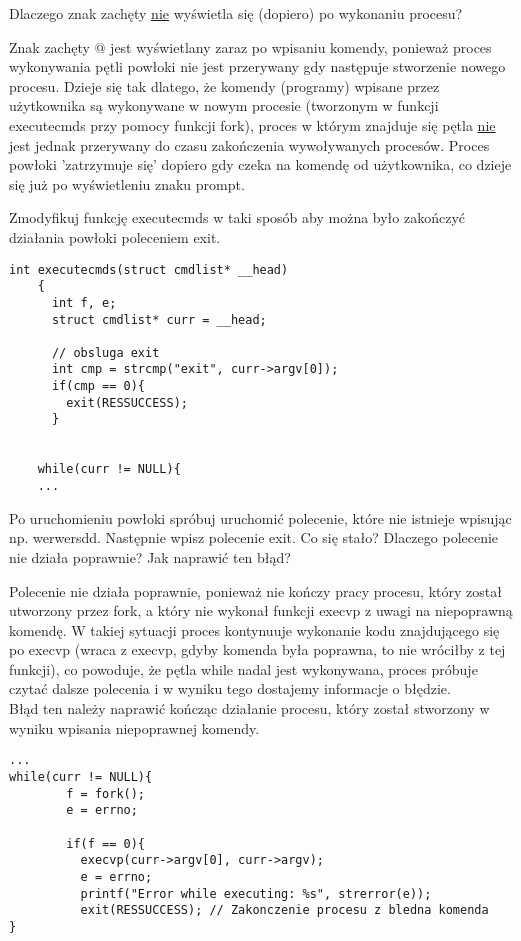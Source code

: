 \documentclass[a4paper,15pt]{article}
\newcommand{\ask}[2]{
    \begin{tcolorbox}[colback=black!5!white,colframe=gray,title={Pytanie #1}]
        #2
    \end{tcolorbox}
}
\newcommand{\assignment}[2]{
    \begin{tcolorbox}[colback=black!5!white,colframe=black,title={Zadanie #1}]
        #2
    \end{tcolorbox}
}
\begin{document}
\newpage
\ask{}
{Dlaczego znak zachęty \underline{nie} wyświetla się (dopiero) po wykonaniu procesu?}
Znak zachęty @ jest wyświetlany zaraz po wpisaniu komendy, ponieważ proces wykonywania pętli powłoki nie jest przerywany gdy następuje stworzenie nowego procesu. Dzieje się tak dlatego, że komendy (programy) wpisane przez użytkownika są wykonywane w nowym procesie (tworzonym w funkcji executecmds przy pomocy funkcji fork), proces w którym znajduje się pętla \underline{nie} jest jednak przerywany do czasu zakończenia 
wywoływanych procesów. Proces powłoki 'zatrzymuje się' dopiero gdy czeka na komendę od użytkownika, co dzieje się już po wyświetleniu znaku prompt. 


\assignment{}{Zmodyfikuj funkcję executecmds w taki sposób aby można było zakończyć działania powłoki poleceniem exit.}
\begin{lstlisting}[style=CStyle, label=some-code, caption=dodanie obsługi exit]
int executecmds(struct cmdlist* __head)
    {
      int f, e;
      struct cmdlist* curr = __head;
     
	  // obsluga exit
	  int cmp = strcmp("exit", curr->argv[0]);
	  if(cmp == 0){
	  	exit(RESSUCCESS);
	  }
	  
			
	while(curr != NULL){
	...
\end{lstlisting}

\assignment{}{Po uruchomieniu powłoki spróbuj uruchomić polecenie, które nie istnieje wpisując np. werwersdd. Następnie wpisz polecenie exit. Co się stało? Dlaczego polecenie nie działa poprawnie? Jak naprawić ten błąd?}
Polecenie nie działa poprawnie, ponieważ nie kończy pracy procesu, który został utworzony przez fork, a który nie wykonał funkcji execvp z uwagi na niepoprawną komendę. W takiej sytuacji proces kontynuuje wykonanie kodu znajdującego się po execvp (wraca z execvp, gdyby komenda była poprawna, to nie wróciłby z tej funkcji), co powoduje, że pętla while nadal jest wykonywana, proces próbuje czytać dalsze polecenia i w wyniku tego dostajemy informacje o błędzie. \\
Błąd ten należy naprawić kończąc działanie procesu, który został stworzony w wyniku wpisania niepoprawnej komendy. 
\begin{lstlisting}[style=CStyle, label=some-code, caption=zakończenie procesu po wywołaniu niepoprawnej komendy]
...
while(curr != NULL){
        f = fork();
        e = errno;
     
        if(f == 0){
          execvp(curr->argv[0], curr->argv);
          e = errno;
          printf("Error while executing: %s", strerror(e));
		  exit(RESSUCCESS); // Zakonczenie procesu z bledna komenda
}
\end{lstlisting}
\end{document}
